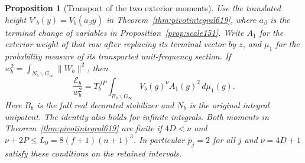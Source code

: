\documentclass[a4paper,11pt]{article}
\newtheorem{proposition}{Proposition}[section]
\theoremstyle{definition}
\theoremstyle{remark}
\numberwithin{equation}{section}
\begin{document}
\begin{proposition}[Transport of the two exterior moments]
\leavevmode\label{prop:exteriortransport620}
Use the translated height \(V'_b(y)=V_b(a_\beta y)\) in
Theorem~\ref{thm:pivotintegral619}, where \(a_\beta\) is the
terminal change of variables in Proposition~\ref{prop:scale151}.
Write \(A_1\) for the exterior weight of that row after replacing
its terminal vector by \(z\), and \(\mu_1\) for the probability
measure of its transported unit-frequency section. If
\(w_b^2=\int_{N_b\backslash G_\infty}\|W_b\|^2\), then
\[
 \frac{\mathcal E_b}{w_b^2}
       =T_b^{\,fP}\int_{B_b\backslash G_\infty}
                       V_b(g)^\nu A_1(g)^2\,d\mu_1(g).
\]
Here \(B_b\) is the full real decorated stabilizer and \(N_b\)
is the original integral unipotent. The identity also holds for
infinite integrals. Both moments in Theorem~\ref{thm:pivotintegral619}
are finite if \(4D<\nu\) and \(\nu+2P\le L_0=8(f+1)(n+1)^3\).
In particular \(p_j=2\) for all \(j\) and \(\nu=4D+1\) satisfy
these conditions on the retained intervals.
\end{proposition}
\end{document}
